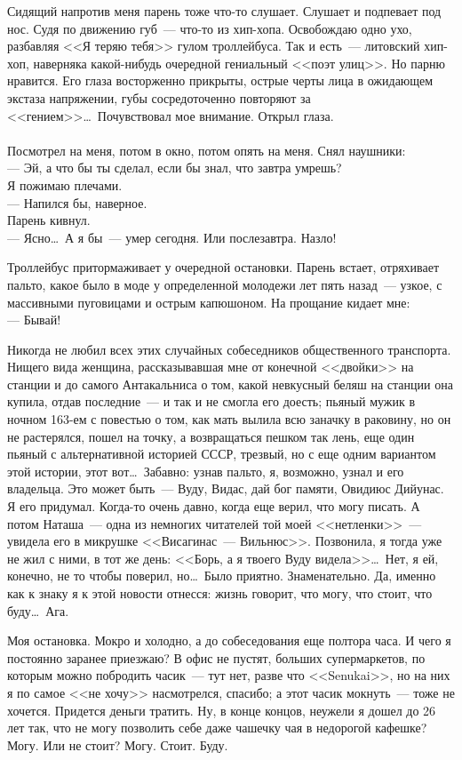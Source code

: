 Сидящий напротив меня парень тоже что-то слушает. Слушает и подпевает под нос. 
Судя по движению губ~--- что-то из хип-хопа. Освобождаю одно ухо, разбавляя <<Я 
теряю тебя>> гулом троллейбуса. Так и есть~--- литовский хип-хоп, наверняка 
какой-нибудь очередной гениальный <<поэт улиц>>. Но парню нравится. Его глаза 
восторженно прикрыты, острые черты лица в ожидающем экстаза напряжении, губы 
сосредоточенно повторяют за <<гением>>\ldots\ Почувствовал мое внимание. Открыл 
глаза. \\
\\
Посмотрел на меня, потом в окно, потом опять на меня. Снял наушники:\\
--- Эй, а что бы ты сделал, если бы знал, что завтра умрешь?\\
Я пожимаю плечами.\\
--- Напился бы, наверное.\\
Парень кивнул.\\
--- Ясно\ldots\ А я бы~--- умер сегодня. Или послезавтра. Назло!


Троллейбус притормаживает у очередной остановки. Парень встает, отряхивает 
пальто, какое было в моде у определенной молодежи лет пять назад~--- узкое, с 
массивными пуговицами и острым капюшоном. На прощание кидает мне:\\
--- Бывай!


Никогда не любил всех этих случайных собеседников общественного транспорта. 
Нищего вида женщина, рассказывавшая мне от конечной <<двойки>> на станции и до 
самого Антакальниса о том, какой невкусный беляш на станции она купила, отдав 
последние~--- и так и не смогла его доесть; пьяный мужик в ночном 163-ем с 
повестью о том, как мать вылила всю заначку в раковину, но он не растерялся, 
пошел на точку, а возвращаться пешком так лень, еще один пьяный с 
альтернативной историей СССР, трезвый, но с еще одним вариантом этой истории, этот вот\ldots\ 
Забавно: узнав пальто, я, возможно, узнал и его владельца. Это может быть~--- 
Вуду, Видас, дай бог памяти, Овидиюс Дийунас. Я его придумал. Когда-то очень 
давно, когда еще верил, что могу писать. А потом Наташа~--- одна из немногих 
читателей той моей <<нетленки>>~--- увидела его в микрушке <<Висагинас~--- 
Вильнюс>>. 
Позвонила, я тогда уже не жил с ними, в тот же день: <<Борь, а я твоего Вуду 
видела>>\ldots\ Нет, я ей, конечно, не то чтобы поверил, но\ldots\ Было 
приятно. 
Знаменательно. Да, именно как к знаку я к этой новости отнесся: жизнь говорит, 
что могу, что стоит, что буду\ldots\ Ага.


Моя остановка. Мокро и холодно, а до собеседования еще полтора часа. И чего я 
постоянно заранее приезжаю? В офис не пустят, больших супермаркетов, по которым 
можно побродить часик~--- тут нет, разве что <<Senukai>>, но на них я по самое 
<<не хочу>> насмотрелся, спасибо; а этот часик мокнуть~--- тоже не хочется. Придется 
деньги тратить. Ну, в конце концов, неужели я дошел до 26 лет так, что не могу 
позволить себе даже чашечку чая в недорогой кафешке? Могу. Или не стоит? Могу. 
Стоит. Буду.


